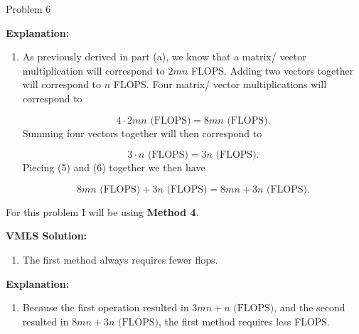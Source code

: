 \begin{problem}{Problem 6}
\begin{Highlight}
        \noindent \textbf{Explanation:}

        \begin{enumerate}[label = (\alph*), start = 2]
            \item As previously derived in part (a), we know that a matrix/ vector multiplication will correspond to $2mn$ FLOPS. Adding two vectors together will correspond to $n$ FLOPS. Four matrix/ vector multiplications
            will correspond to 
    
            \begin{equation}
                4 \cdot 2mn \text{ (FLOPS)} = 8mn \text{ (FLOPS)}.
            \end{equation}
            Summing four vectors together will then correspond to 
    
            \begin{equation}
                3 \cdot n \text{ (FLOPS)} = 3n \text{ (FLOPS)}.
            \end{equation}
            Piecing (5) and (6) together we then have
    
            \begin{equation}
                8mn \text{ (FLOPS)} + 3n \text{ (FLOPS)} = 8mn + 3n \text{ (FLOPS)}.
            \end{equation}
        \end{enumerate}
    \end{Highlight}

    \begin{Highlight}
        For this problem I will be using \textbf{Method 4}. \vspace*{1em}

        \noindent \textbf{VMLS Solution:}

        \begin{enumerate}[label = (\alph*), start = 3]
            \item The first method always requires fewer flops.
        \end{enumerate}

        \noindent \textbf{Explanation:}

        \begin{enumerate}[label = (\alph*), start = 3]
            \item Because the first operation resulted in $3mn + n \text{ (FLOPS)}$, and the second resulted in $8mn + 3n \text{ (FLOPS)}$, the first method requires less FLOPS.
        \end{enumerate}
    \end{Highlight}
\end{problem}

